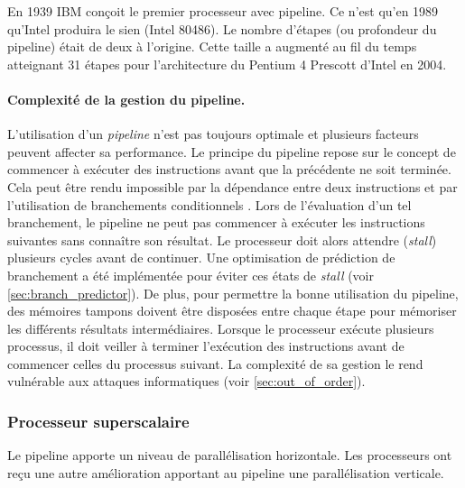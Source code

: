             En 1939 IBM conçoit le premier processeur avec pipeline. Ce n'est qu'en 1989 qu'Intel produira le sien (Intel 80486). Le nombre d'étapes (ou profondeur du pipeline) était de deux à l'origine. Cette taille a augmenté au fil du temps atteignant 31 étapes pour l'architecture du Pentium 4 Prescott d'Intel en 2004. 
        
        \paragraph{Complexité de la gestion du pipeline.}
            
            L'utilisation d'un \textit{pipeline} n'est pas toujours optimale et plusieurs facteurs peuvent affecter sa performance. Le principe du pipeline repose sur le concept de commencer à exécuter des instructions avant que la précédente ne soit terminée. Cela peut être rendu impossible par la dépendance entre deux instructions et par l'utilisation de branchements conditionnels \cite{emma1987characterization}. Lors de l'évaluation d'un tel branchement, le pipeline ne peut pas commencer à exécuter les instructions suivantes sans connaître son résultat. Le processeur doit alors attendre (\textit{stall}) plusieurs cycles avant de continuer. Une optimisation de prédiction de branchement a été implémentée pour éviter ces états de \textit{stall} (voir \autoref{sec:branch_predictor}). De plus, pour permettre la bonne utilisation du pipeline, des mémoires tampons doivent être disposées entre chaque étape pour mémoriser les différents résultats intermédiaires. Lorsque le processeur exécute plusieurs processus, il doit veiller à terminer l'exécution des instructions avant de commencer celles du processus suivant. La complexité de sa gestion le rend vulnérable aux attaques informatiques (voir \autoref{sec:out_of_order}). 
        










    
    
    \subsubsection{Processeur superscalaire} \label{sec:superscalar}
        
        Le pipeline apporte un niveau de parallélisation horizontale. Les processeurs ont reçu une autre amélioration apportant au pipeline une parallélisation verticale. 
        
